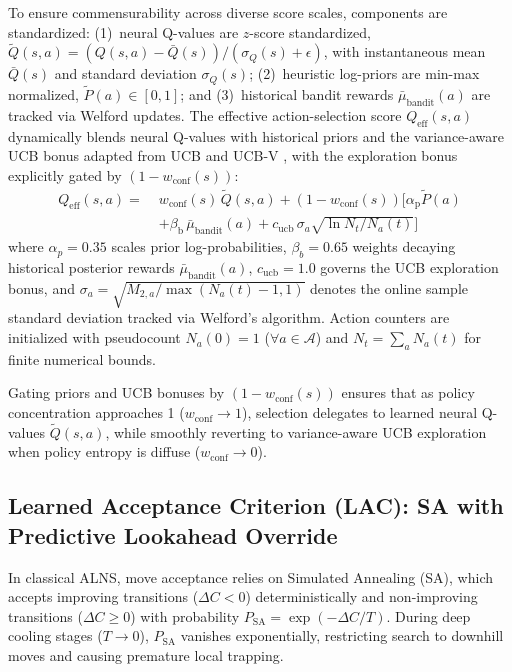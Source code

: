 \documentclass{ieeeaccess}
\begin{document}
To ensure commensurability across diverse score scales, components are standardized: (1)~neural Q-values are $z$-score standardized, $\tilde{Q}(s, a) = (Q(s, a) - \bar{Q}(s))/(\sigma_Q(s) + \epsilon)$, with instantaneous mean $\bar{Q}(s)$ and standard deviation $\sigma_Q(s)$; (2)~heuristic log-priors are min-max normalized, $\tilde{P}(a) \in [0, 1]$; and (3)~historical bandit rewards $\bar{\mu}_{\text{bandit}}(a)$ are tracked via Welford updates.
The effective action-selection score $Q_{\text{eff}}(s, a)$ dynamically blends neural Q-values with historical priors and the variance-aware UCB bonus adapted from UCB \cite{auer2002finite} and UCB-V \cite{audibert2009exploration}, with the exploration bonus explicitly gated by $(1 - w_{\text{conf}}(s))$:
\begin{align}
  Q_{\text{eff}}(s, a) = \; &w_{\text{conf}}(s)\,\tilde{Q}(s, a) + (1 - w_{\text{conf}}(s))\Big[ \alpha_{\text{p}}\tilde{P}(a) \nonumber \\
  &+ \beta_{\text{b}}\,\bar{\mu}_{\text{bandit}}(a) + c_{\text{ucb}}\,\sigma_a \sqrt{\ln N_t / N_a(t)} \Big]
  \label{eq:q_eff_blending}
\end{align}
where $\alpha_p = 0.35$ scales prior log-probabilities, $\beta_b = 0.65$ weights decaying historical posterior rewards $\bar{\mu}_{\text{bandit}}(a)$, $c_{\text{ucb}} = 1.0$ governs the UCB exploration bonus, and $\sigma_a = \sqrt{M_{2, a}/\max(N_a(t) - 1, 1)}$ denotes the online sample standard deviation tracked via Welford's algorithm. Action counters are initialized with pseudocount $N_a(0) = 1$ ($\forall a \in \mathcal{A}$) and $N_t = \sum_a N_a(t)$ for finite numerical bounds.

Gating priors and UCB bonuses by $(1 - w_{\text{conf}}(s))$ ensures that as policy concentration approaches 1 ($w_{\text{conf}} \to 1$), selection delegates to learned neural Q-values $\tilde{Q}(s, a)$, while smoothly reverting to variance-aware UCB exploration when policy entropy is diffuse ($w_{\text{conf}} \to 0$).

\subsection{Learned Acceptance Criterion (LAC): SA with Predictive Lookahead Override}
\label{sec:lac}

In classical ALNS, move acceptance relies on Simulated Annealing (SA), which accepts improving transitions ($\Delta C < 0$) deterministically and non-improving transitions ($\Delta C \ge 0$) with probability $P_{\text{SA}} = \exp(-\Delta C / T)$. During deep cooling stages ($T \to 0$), $P_{\text{SA}}$ vanishes exponentially, restricting search to downhill moves and causing premature local trapping.
\end{document}
